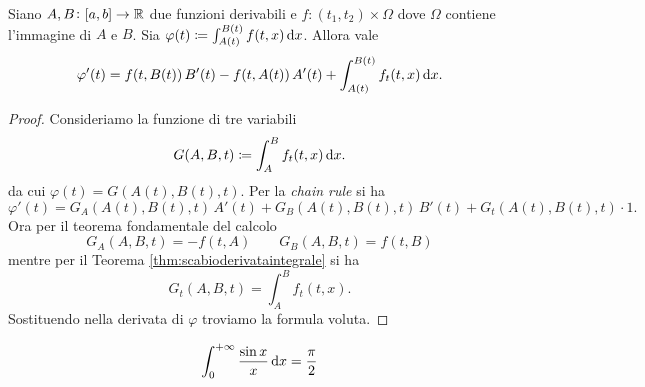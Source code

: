 \begin{prop}
	Siano $ A, B \colon [a, b] \to \mathbb{R} $ due funzioni derivabili e $ f \colon (t_1, t_2) \times \Omega $ dove $ \Omega $ contiene l'immagine di $ A $ e $ B $. Sia $ \varphi(t) \coloneqq \int_{A(t)}^{B(t)} f(t, x) \dif{x} $. Allora vale
	\[
		\varphi'(t) = f(t, B(t)) \, B'(t) - f(t, A(t)) \, A'(t) + \int_{A(t)}^{B(t)} f_t(t, x) \dif{x}.
	\]
\end{prop}
%
\begin{proof}
	Consideriamo la funzione di tre variabili
	\[
		G(A, B, t) \coloneqq \int_{A}^{B} f_t(t, x) \dif{x}.
	\]
	da cui $ \varphi(t) = G(A(t), B(t), t) $. Per la \emph{chain rule} si ha
	\[
		\varphi'(t) = G_A(A(t), B(t), t) \, A'(t) + G_B(A(t), B(t), t) \, B'(t) + G_t(A(t), B(t), t) \cdot 1. 
	\]
	Ora per il teorema fondamentale del calcolo
	\[
		G_A(A, B, t) = - f(t, A) \qquad G_B(A, B, t) = f(t, B) 
	\]
	mentre per il Teorema \ref{thm:scabioderivataintegrale} si ha 
	\[
		G_t(A, B, t) = \int_{A}^{B} f_t(t, x).
	\]
	Sostituendo nella derivata di $ \varphi $ troviamo la formula voluta. 
\end{proof}

\begin{prop}
	\[ \int_0^{+\infty} \frac{\sin x}{x} \dif{x} = \frac{\pi}{2} \]
\end{prop}

